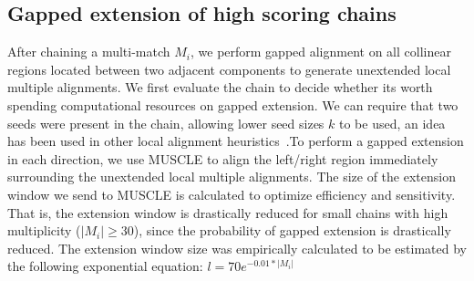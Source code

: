 \documentclass{ws-procs975x65}
\begin{document}
\subsection{Gapped extension of high scoring chains}

After chaining a multi-match $M_i$, we perform gapped alignment on all collinear regions located between two adjacent components to generate unextended local multiple alignments. We first evaluate the chain to decide whether its worth spending computational resources on gapped extension. We can require that two seeds were present in the chain, allowing lower seed sizes $k$ to be used, an idea has been used in other local alignment heuristics~\cite{ref-blastz,ref-gappedblast,ref-blat}.To perform a gapped extension in each direction, we use MUSCLE to align the left/right region immediately surrounding the unextended local multiple alignments. The size of the extension window we send to MUSCLE is calculated to optimize efficiency and sensitivity. That is, the extension window is drastically reduced for small chains with high multiplicity ($|M_{i}|\geq 30$), since the probability of gapped extension is drastically reduced. The extension window size was empirically calculated to be estimated by the following exponential equation: $l = 70e^{-0.01*|M_{i}|}$
\end{document}
